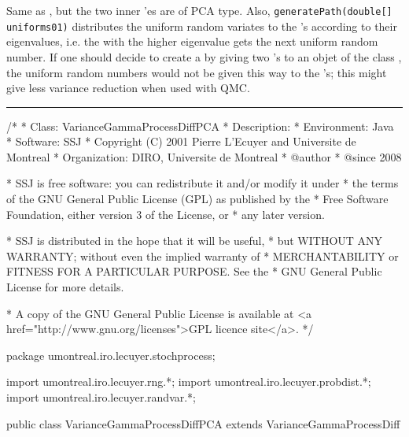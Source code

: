 %
%
%


Same as , but the two inner 
'es are of PCA type.  Also, 
\texttt{generatePath(double[] uniforms01)} distributes 
the uniform random variates to the 's  according to their 
eigenvalues, i.e. the  with the higher eigenvalue 
gets the next uniform random number.  If one should decide to create a 
 by giving two 's to an 
objet of the class , the uniform random 
numbers would not be given this way
to the 's; this  might give less variance reduction when 
used with QMC.

\bigskip\hrule\bigskip

\begin{code}
\begin{hide}
/*
 * Class:        VarianceGammaProcessDiffPCA
 * Description:  
 * Environment:  Java
 * Software:     SSJ 
 * Copyright (C) 2001  Pierre L'Ecuyer and Universite de Montreal
 * Organization: DIRO, Universite de Montreal
 * @author       
 * @since        2008

 * SSJ is free software: you can redistribute it and/or modify it under
 * the terms of the GNU General Public License (GPL) as published by the
 * Free Software Foundation, either version 3 of the License, or
 * any later version.

 * SSJ is distributed in the hope that it will be useful,
 * but WITHOUT ANY WARRANTY; without even the implied warranty of
 * MERCHANTABILITY or FITNESS FOR A PARTICULAR PURPOSE.  See the
 * GNU General Public License for more details.

 * A copy of the GNU General Public License is available at
   <a href="http://www.gnu.org/licenses">GPL licence site</a>.
 */
\end{hide}
package umontreal.iro.lecuyer.stochprocess;\begin{hide}
import umontreal.iro.lecuyer.rng.*;
import umontreal.iro.lecuyer.probdist.*;
import umontreal.iro.lecuyer.randvar.*;

\end{hide}

public class VarianceGammaProcessDiffPCA extends VarianceGammaProcessDiff \begin{hide} {
    int[] indexEigenUp;
    int[] indexEigenDw;

\end{hide}
\end{code}
